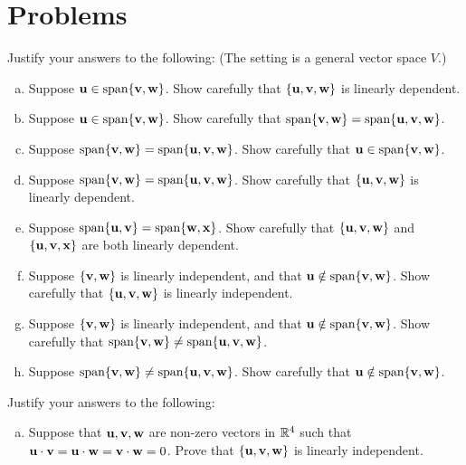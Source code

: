 \section*{Problems}


 \begin{prob} \label{prob08.1} Justify your answers to the following: (The setting is a general vector space $V$.)\medskip
\begin{enumerate}[a)] 

\item  Suppose $\mathbf{u} \in \textrm{span}\{\mathbf{v},\mathbf{w}\}$. Show carefully that $\{\mathbf{u},\mathbf{v},\mathbf{w} \}$ is linearly dependent.
\medskip
%
\item\sov  Suppose $\mathbf{u} \in \textrm{span}\{\mathbf{v},\mathbf{w}\}$. Show carefully that $\textrm{span}\{\mathbf{v},\mathbf{w}\}=\textrm{span}\{\mathbf{u},\mathbf{v},\mathbf{w}\}$.
\medskip
%

\item  Suppose $\textrm{span}\{\mathbf{v},\mathbf{w}\}=\textrm{span}\{\mathbf{u},\mathbf{v},\mathbf{w}\}$. Show carefully that $\mathbf{u} \in \textrm{span}\{\mathbf{v},\mathbf{w}\}$. 
\medskip
%

\item\sov  Suppose $\textrm{span}\{\mathbf{v},\mathbf{w}\}=\textrm{span}\{\mathbf{u},\mathbf{v},\mathbf{w}\}$. Show carefully that $\{\mathbf{u},\mathbf{v},\mathbf{w} \}$ is linearly dependent. 
\medskip
%

\item  Suppose $\textrm{span}\{\mathbf{u},\mathbf{v}\}=\textrm{span}\{\mathbf{w},\mathbf{x}\}$. Show carefully that $\{\mathbf{u},\mathbf{v},\mathbf{w} \}$ and $\{\mathbf{u},\mathbf{v},\mathbf{x} \}$ are both linearly dependent. 
\medskip
%
 
\item\sov  Suppose $\{\mathbf{v},\mathbf{w} \}$ is linearly independent, and that $\mathbf{u} \notin \textrm{span}\{\mathbf{v},\mathbf{w}\}$. Show carefully that $\{\mathbf{u},\mathbf{v},\mathbf{w} \}$ is linearly independent.
\medskip
% 
\item  Suppose $\{\mathbf{v},\mathbf{w} \}$ is linearly independent, and that $\mathbf{u} \notin \textrm{span}\{\mathbf{v},\mathbf{w}\}$. Show carefully that $\textrm{span}\{\mathbf{v},\mathbf{w}\}\not=\textrm{span}\{\mathbf{u},\mathbf{v},\mathbf{w}\}$.
\medskip
%

\item\sov  Suppose $\textrm{span}\{\mathbf{v},\mathbf{w}\}\not=\textrm{span}\{\mathbf{u},\mathbf{v},\mathbf{w}\}$. Show carefully that $\mathbf{u} \notin \textrm{span}\{\mathbf{v},\mathbf{w}\}$. 
\medskip
% 
\end{enumerate}

\end{prob} \begin{prob} \label{prob08.2} Justify your answers to the following:\medskip
\begin{enumerate}[a)] 


\item Suppose that $\mathbf{u},\mathbf{v},\mathbf{w}$ are non-zero vectors in $\mathbb{R}^4$ such that
$\mathbf{u}\cdot \mathbf{v}= \mathbf{u}\cdot \mathbf{w}= \mathbf{v}\cdot \mathbf{w}=0$. Prove that $\{\mathbf{u},\mathbf{v},\mathbf{w} \}$ is linearly independent.\medskip




\end{enumerate}
\end{prob}
